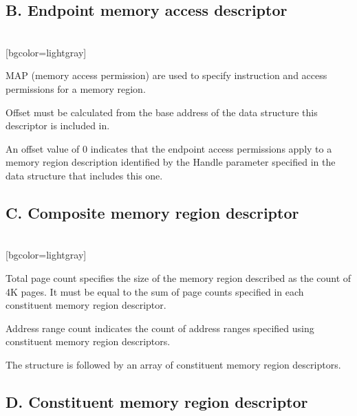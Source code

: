 \documentclass{article}
\begin{document}
\subsection*{B. Endpoint memory access descriptor}

\begin{bytefield}[bitwidth=2.5em]{16}
	\\	
	[bgcolor=lightgray]{}
\end{bytefield}

MAP (memory access permission) are used to specify instruction and access permissions for a memory region.

Offset must be calculated from the base address of
the data structure this descriptor is included in.

An offset value of 0 indicates that the endpoint
access permissions apply to a memory region
description identified by the Handle parameter
specified in the data structure that includes this
one.

\subsection*{C. Composite memory region descriptor}

\begin{bytefield}[bitwidth=2.5em]{16}
	\\	
	[bgcolor=lightgray]{}
\end{bytefield}

Total page count specifies the size of the memory region described as the count
of 4K pages. It must be equal to the sum of page counts specified
in each constituent memory region descriptor.

Address range count indicates the count of address ranges specified using
constituent memory region descriptors.

The structure is followed by an array of constituent memory region descriptors.

\subsection*{D. Constituent memory region descriptor}
\end{document}

